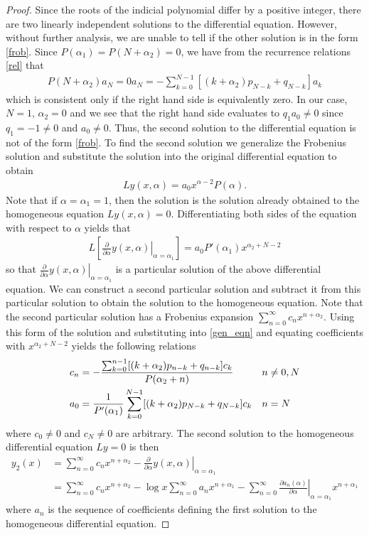 \documentclass[12pt]{article}
\theoremstyle{definition}
\begin{document}
\begin{proof}
  Since the roots of the indicial polynomial differ by a positive integer,
  there are two linearly independent solutions to the differential equation.
  However, without further analysis, we are unable to tell if the other solution is in the form \eqref{frob}.
  Since $P(\alpha_1) = P(N + \alpha_2) = 0$, we have from the recurrence relations \eqref{rel} that
  \begin{align*}
    P(N+\alpha_2)a_N = 0a_N = -\sum_{k=0}^{N-1}\left[(k+\alpha_2) p_{N-k} + q_{N-k}\right]a_k
  \end{align*}
  which is consistent only if the right hand side is equivalently zero. In our case, $N=1$, $\alpha_2 = 0$
  and we see that the right hand side evaluates to $q_1a_0 \neq 0$ since $q_1 = -1 \neq 0$ and $a_0 \neq 0$. Thus, the second solution to the differential equation is not of the form
  \eqref{frob}. To find the second solution we generalize the Frobenius solution
  and substitute the solution into the original differential equation to obtain
  \begin{align*}
    Ly(x,\alpha) = a_0 x^{\alpha - 2}P(\alpha).
  \end{align*}
  Note that if $\alpha=\alpha_1 = 1$, then the solution is the solution already obtained to the homogeneous equation $Ly(x,\alpha) = 0$.
  Differentiating both sides of the equation with respect to $\alpha$ yields that
  \begin{align}\label{gen_eqn}
    L\left[\left.\frac{\partial}{\partial\alpha}y(x,\alpha)\right|_{\alpha=\alpha_1}\right] = a_0P'(\alpha_1) x^{\alpha_2+N-2}
  \end{align}
  so that $\left.\frac{\partial}{\partial\alpha}y(x,\alpha)\right|_{\alpha=\alpha_1}$ is a particular solution of the above differential equation.
  We can construct a second particular solution and subtract it from this particular solution to obtain the solution to the homogeneous equation. Note that the second particular
  solution has a Frobenius expansion $\sum_{n=0}^{\infty}c_n x^{n+\alpha_2}$.
  Using this form of the solution and substituting into \eqref{gen_eqn} and equating coefficients with $x^{\alpha_2+N-2}$ yields the following
  relations
  \begin{align}\label{sec_rel}
    c_n &=- \frac{\sum_{k=0}^{n-1} [(k + \alpha_2)p_{n-k} + q_{n-k}]c_k}{P(\alpha_2 + n)} &n&\neq0,N \notag\\
    a_0 &= \frac{1}{P'(\alpha_1)}\sum_{k=0}^{N-1}[(k + \alpha_2)p_{N-k} + q_{N-k}]c_k &n&=N
  \end{align}
  where $c_0 \neq 0$ and $c_N\neq 0$ are arbitrary. The second solution to the homogeneous differential equation  $Ly=0$ is then
  \begin{align*}
    y_2(x) &= \sum_{n=0}^\infty c_n x^{n+\alpha_2} - \left.\frac{\partial}{\partial\alpha}y(x,\alpha)\right|_{\alpha=\alpha_1} \\
    &= \sum_{n=0}^\infty c_n x^{n+\alpha_2} - \log x\sum_{n=0}^{\infty}a_n x^{n+\alpha_1} - \sum_{n=0}^\infty\left.\frac{\partial a_n(\alpha)}{\partial \alpha}\right|_{\alpha=\alpha_1} x^{n+\alpha_1}
  \end{align*}
  where $a_n$ is the sequence of coefficients defining the first solution to the homogeneous differential equation.


\end{proof}
\end{document}
